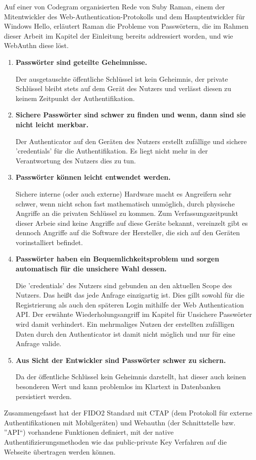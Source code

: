 Auf einer von Codegram organisierten Rede von Suby Raman, einem der Mitentwickler des Web-Authentication-Protokolls und dem Hauptentwickler für Windows Hello, erläutert Raman die Probleme von Passwörtern, die im Rahmen dieser Arbeit im Kapitel der Einleitung bereits addressiert worden, und wie WebAuthn diese löst.

\begin{enumerate} 
\item \textbf{Passwörter sind geteilte Geheimnisse.}

Der ausgetauschte öffentliche Schlüssel ist kein Geheimnis, der private Schlüssel bleibt stets auf dem Gerät des Nutzers und verlässt diesen zu keinem Zeitpunkt der Authentifikation.

\item \textbf{Sichere Passwörter sind schwer zu finden und wenn, dann sind sie nicht leicht merkbar.}

Der Authenticator auf den Geräten des Nutzers erstellt zufällige und sichere 'credentials' für die Authentifikation. Es liegt nicht mehr in der Verantwortung des Nutzers dies zu tun.

\item \textbf{Passwörter können leicht entwendet werden.}

Sichere interne (oder auch externe) Hardware macht es Angreifern sehr schwer, wenn nicht schon fast mathematisch unmöglich, durch physische Angriffe an die privaten Schlüssel zu kommen. Zum Verfassungszeitpunkt dieser Arbeie sind keine Angriffe auf diese Geräte bekannt, vereinzelt gibt es dennoch Angriffe auf die Software der Hersteller, die sich auf den Geräten vorinstalliert befindet.

\item \textbf{Passwörter haben ein Bequemlichkeitsproblem und sorgen automatisch für die unsichere Wahl dessen.}

Die 'credentials' des Nutzers sind gebunden an den aktuellen Scope des Nutzers. Das heißt das jede Anfrage einzigartig ist. Dies gillt sowohl für die Registrierung als auch den späteren Login mithilfe der Web Authentication API. Der erwähnte Wiederholungsangriff im Kapitel für Unsichere Passwörter wird damit verhindert. Ein mehrmaliges Nutzen der erstellten zufälligen Daten durch den Authenticator ist damit nicht möglich und nur für eine Anfrage valide.

\item \textbf{Aus Sicht der Entwickler sind Passwörter schwer zu sichern.}

Da der öffentliche Schlüssel kein Geheimnis darstellt, hat dieser auch keinen besonderen Wert und kann problemlos im Klartext in Datenbanken persistiert werden.
\end{enumerate}

Zusammengefasst hat der FIDO2 Standard mit CTAP (dem Protokoll für externe Authentifikationen mit Mobilgeräten) und Webauthn (der Schnittstelle bzw. ''API``) vorhandene Funktionen definiert, mit der native Authentifizierungsmethoden wie das public-private Key Verfahren auf die Webseite übertragen werden können.
